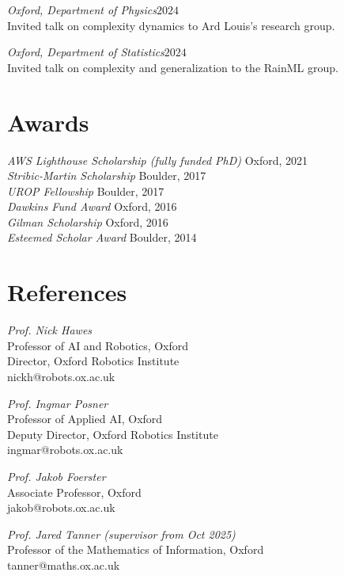\documentclass[margin]{res}
\begin{document}
\begin{resume}
                {\sl Oxford, Department of Physics\hfill $2024$}\\
                Invited talk on complexity dynamics to Ard Louis's research group.

                {\sl Oxford, Department of Statistics\hfill $2024$}\\
                Invited talk on complexity and generalization to the RainML group.


                \section{Awards}

                {\sl AWS Lighthouse Scholarship (fully funded PhD)} \hfill Oxford, 2021 \\
                {\sl Stribic-Martin Scholarship} \hfill Boulder, 2017 \\
                {\sl UROP Fellowship} \hfill Boulder, 2017 \\
                {\sl Dawkins Fund Award} \hfill Oxford, 2016 \\
                {\sl Gilman Scholarship} \hfill Oxford, 2016 \\
                {\sl Esteemed Scholar Award} \hfill Boulder, 2014 \\


                \section{References}
                        {\sl Prof. Nick Hawes}\\
                        Professor of AI and Robotics, Oxford\\
                        Director, Oxford Robotics Institute\\
                        nickh@robots.ox.ac.uk

                        {\sl Prof. Ingmar Posner}\\
                        Professor of Applied AI, Oxford\\
                        Deputy Director, Oxford Robotics Institute\\
                        ingmar@robots.ox.ac.uk

                        {\sl Prof. Jakob Foerster}\\
                        Associate Professor, Oxford\\
                        jakob@robots.ox.ac.uk

                        {\sl Prof. Jared Tanner (supervisor from Oct 2025)}\\
                          Professor of the Mathematics of Information, Oxford\\
                          tanner@maths.ox.ac.uk

\end{resume}
\end{document}
